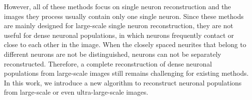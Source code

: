 However, all of these methods focus on single neuron reconstruction and the images they process usually contain only one single neuron.
Since these methods are mainly designed for large-scale single neuron reconstruction, they are not useful for dense neuronal populations, in which neurons frequently contact or close to each other in the image.
When the closely spaced neurites that belong to different neurons are not be distinguished, neurons can not be separately reconstructed.
Therefore, a complete reconstruction of dense neuronal populations from large-scale images still remains challenging for existing methods.
%
In this work, we introduce a new algorithm to reconstruct neuronal populations from large-scale or even ultra-large-scale images.
